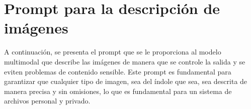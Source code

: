 
\chapter{Prompt para la descripción de imágenes}
\label{anx:prompt_img_desc}

A continuación, se presenta el prompt que se le proporciona al modelo multimodal que describe las imágenes de manera que se controle la salida y se eviten problemas de contenido sensible. Este prompt es fundamental para garantizar que cualquier tipo de imagen, sea del índole que sea, sea descrita de manera precisa y sin omisiones, lo que es fundamental para un sistema de archivos personal y privado.


